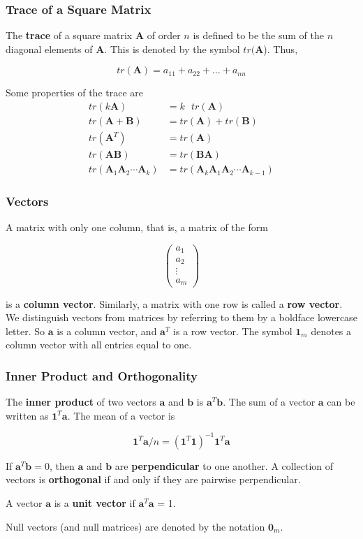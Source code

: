 \documentclass{beamer}
\begin{document}
\begin{frame}
\frametitle{Trace of a Square Matrix}
The \textbf{trace} of a square matrix $\mathbf{A}$ of order $n$ is defined to be the sum of the $n$ diagonal elements of $\mathbf{A}$.  This is denoted by the symbol $tr(\mathbf{A}$).  Thus,

\[tr(\mathbf{A}) = a_{11} + a_{22} + \hdots + a_{nn}\]

Some properties of the trace are
\begin{align*}
tr(k\mathbf{A}) &= k\text{ }tr(\mathbf{A}) \\
tr(\mathbf{A} + \mathbf{B}) &= tr(\mathbf{A})+ tr(\mathbf{B}) \\
tr(\mathbf{A}^T) &= tr(\mathbf{A}) \\
tr(\mathbf{AB}) &= tr(\mathbf{BA}) \\
tr(\mathbf{A}_1\mathbf{A}_2\cdots\mathbf{A}_k) &= tr(\mathbf{A}_k\mathbf{A}_1\mathbf{A}_2\cdots \mathbf{A}_{k-1})
\end{align*}
\end{frame}

\begin{frame}
\frametitle{Vectors}
A matrix with only one column, that is, a matrix of the form

\[\begin{pmatrix}
    a_1\\
    a_2\\
    \vdots  \\
    a_m
\end{pmatrix}
\]

is a \textbf{column vector}.  Similarly, a matrix with one row is called a \textbf{row vector}.  We distinguish vectors from matrices by referring to them by a boldface lowercase letter.  So $\mathbf{a}$ is a column vector, and $\mathbf{a}^T$ is a row vector.  The symbol $\mathbf{1}_m$ denotes a column vector with all entries equal to one.\\
\end{frame}

\begin{frame}
\frametitle{Inner Product and Orthogonality}
The \textbf{inner product} of two vectors $\mathbf{a}$ and $\mathbf{b}$ is $\mathbf{a}^T\mathbf{b}$.  The sum of a vector $\mathbf{a}$ can be written as $\mathbf{1}^T\mathbf{a}$.  The mean of a vector is

\[\mathbf{1}^T\mathbf{a}/n = (\mathbf{1}^T\mathbf{1})^{-1}\mathbf{1}^T\mathbf{a}\]

If $\mathbf{a}^T\mathbf{b} = 0$, then $\mathbf{a}$ and $\mathbf{b}$ are \textbf{perpendicular} to one another.  A collection of vectors is \textbf{orthogonal} if and only if they are pairwise perpendicular.
\vspace{5mm}

A vector $\mathbf{a}$ is a \textbf{unit vector} if $\mathbf{a}^T\mathbf{a}$ = 1.
\vspace{5mm}

Null vectors (and null matrices) are denoted by the notation $\mathbf{0}_m$.
\end{frame}
\end{document}
